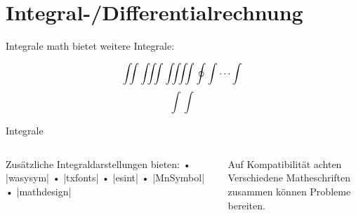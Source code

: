 \let\oldbar|
\let\exclam! %


\newcommand\messdaten{
\toprule
\bf Pendellänge $l$ [\si{m}]& \bf Dauer $T$ [\si{s}]\\\midrule
4 & 8 \\
2 & 4 \\
1   & 2 \\
.9  & 1.8 \\
0.8 & 1.6 \\
0.7 & 1.4 \\
0.6 & 1.2 \\
0.5 & 1.0 \\
0.4 & 0.8 \\
0.3 & 0.6 \\
0.2 & 0.4 \\
0.1 & 0.2 \\
0.05 & 0.1 \\
0.02 & 0.05 \\
0.01 & 0.02 \\
0.005 & 0.01 \\
0.0025 & 0.005\\
\bottomrule
}
\let\eV\relax
\usepackage{
  12many,
  braket,
  cases,
  esvect,
  feyn,
  mathtools,
  gnuplottex,
  pdfpages,
  relsize,
  siunitx,
  soul
}
\usepackage[normalem]{ulem}



\section{Integral-/Differentialrechnung}
\begin{frame}[fragile]{Integrale}
\AMS{}math bietet weitere Integrale:
\begin{LTXexample} 
\[\iint \iiint \iiiint \oint \idotsint\]
\[\int \int\]
\end{LTXexample}
\end{frame}

\begin{frame}[fragile]{Integrale}
\begin{columns}
\begin{column}{.4\textwidth}
Zusätzliche Integraldarstellungen bieten:
• |wasysym|
• |txfonts|
• |esint|
• |MnSymbol|
• |mathdesign|
\•
\end{column}
\begin{column}{.5\textwidth}
\alert{Auf Kompatibilität achten}\\
Verschiedene Matheschriften zusammen können Probleme bereiten.
\end{column}
\end{columns}
\end{frame}

